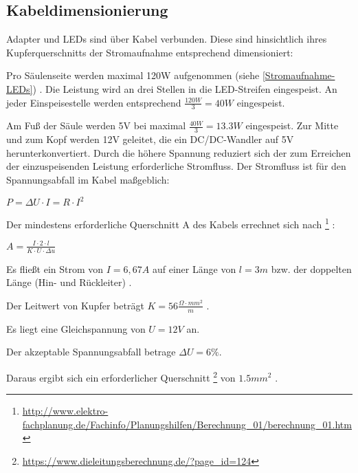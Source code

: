 
\subsection{Kabeldimensionierung}
Adapter und LEDs sind über Kabel verbunden.
Diese sind
hinsichtlich ihres Kupferquerschnitts
der Stromaufnahme entsprechend
dimensioniert:

Pro S\"aulenseite werden maximal 120W aufgenommen
(siehe \ref{Stromaufnahme-LEDs})
.
Die Leistung wird an drei Stellen in die LED-Streifen eingespeist.
An jeder Einspeisestelle
werden entsprechend
$
\frac{120W}{3} = 40W
$
eingespeist.

Am Fu{\ss} der S\"aule werden 5V
bei maximal
$
\frac{40 W}{3} = 13.3 W
$
eingespeist.
Zur Mitte und zum Kopf werden 12V geleitet,
die ein DC/DC-Wandler
auf 5V
herunterkonvertiert.
Durch die h\"ohere Spannung reduziert sich
der zum Erreichen der einzuspeisenden Leistung
erforderliche Stromfluss.
Der Stromfluss ist f\"ur den
Spannungsabfall
im Kabel
ma{\ss}geblich:
\begin{center}
	$
	P = {\Delta}U \cdot I = R \cdot I^2
	$
\end{center}

Der mindestens erforderliche
Querschnitt A des Kabels
errechnet sich nach
\footnote{
	\url{http://www.elektro-fachplanung.de/Fachinfo/Planungshilfen/Berechnung\_01/berechnung\_01.htm}
}
:

\begin{center}
	$
	A = \frac{I \cdot 2 \cdot l}{K \cdot U \cdot {\Delta}u}
	$
\end{center}

Es flie{\ss}t ein Strom von
$
I = 6,67 A
$
auf einer L\"ange von
$
l = 3m
$
bzw.
der doppelten L\"ange (Hin- und R\"uckleiter)
.

Der Leitwert von Kupfer betr\"agt
$
K = 56 \frac{\Omega \cdot mm^2}m
$
.

Es liegt eine Gleichspannung von
$
U = 12V
$
an.

Der akzeptable Spannungsabfall betrage ${\Delta}U = 6\%$.

Daraus ergibt sich ein erforderlicher Querschnitt
\footnote{
	\url{https://www.dieleitungsberechnung.de/?page\_id=124}
}
von
$
1.5mm^2
$
.
